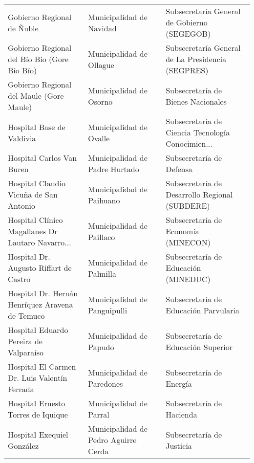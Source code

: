 \documentclass[11pt]{article}
\begin{document}
\begin{longtable}{ p{5cm} | p{5cm} | p{5cm} }
                        Gobierno Regional de Ñuble &                           Municipalidad de Navidad &        Subsecretaría General de Gobierno (SEGEGOB) \\
      Gobierno Regional del Bío Bío (Gore Bío Bío) &                           Municipalidad de Ollague &  Subsecretaría General de La Presidencia (SEGPRES) \\
          Gobierno Regional del Maule (Gore Maule) &                            Municipalidad de Osorno &                 Subsecretaría de Bienes Nacionales \\
                         Hospital Base de Valdivia &                            Municipalidad de Ovalle &  Subsecretaría de Ciencia Tecnología Conocimien... \\
                         Hospital Carlos Van Buren &                     Municipalidad de Padre Hurtado &                           Subsecretaría de Defensa \\
            Hospital Claudio Vicuña de San Antonio &                          Municipalidad de Paihuano &     Subsecretaría de Desarrollo Regional (SUBDERE) \\
 Hospital Clínico Magallanes Dr Lautaro Navarro... &                          Municipalidad de Paillaco &                Subsecretaría de Economía (MINECON) \\
            Hospital Dr. Augusto Riffart de Castro &                          Municipalidad de Palmilla &               Subsecretaría de Educación (MINEDUC) \\
   Hospital Dr. Hernán Henríquez Aravena de Temuco &                       Municipalidad de Panguipulli &              Subsecretaría de Educación Parvularia \\
            Hospital Eduardo Pereira de Valparaíso &                            Municipalidad de Papudo &                Subsecretaría de Educación Superior \\
      Hospital El Carmen Dr. Luis Valentín Ferrada &                         Municipalidad de Paredones &                           Subsecretaría de Energía \\
                Hospital Ernesto Torres de Iquique &                            Municipalidad de Parral &                          Subsecretaría de Hacienda \\
                        Hospital Exequiel González &               Municipalidad de Pedro Aguirre Cerda &                          Subsecretaría de Justicia \\

\end{longtable}
\end{document}
